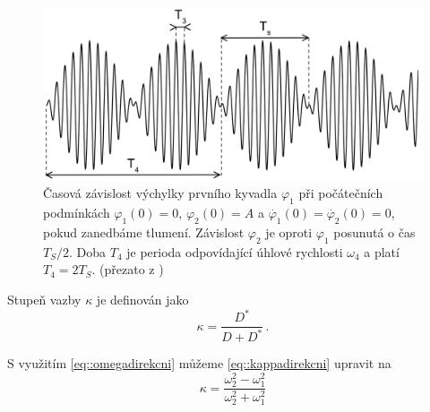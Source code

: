 \begin{figure}[htbp]
\centering
\includegraphics[width=\textwidth-2cm]{graficos/ts}
\caption{Časová závislost výchylky prvního kyvadla $\varphi_1$ při počátečních podmínkách $\varphi_1(0)=0$, $\varphi_2(0)=A$ a $\dot{\varphi_1}(0)=\dot{\varphi_2}(0)=0$, pokud zanedbáme tlumení. Závislost $\varphi_2$ je oproti $\varphi_1$ posunutá o čas $T_S/2$. Doba $T_4$ je perioda odpovídající úhlové rychlosti $\omega_4$ a platí $T_4=2T_S$. (přezato z \cite{ZFP})}
\label{obr::tretipripad}
\end{figure}

Stupeň vazby $\kappa$ je definován jako \cite{ZFP}
\begin{equation} \label{eq::kappadirekcni}
\kappa = \frac{D^{\ast}}{D+D^{\ast}} \,.
\end{equation} 

S využitím \eqref{eq::omegadirekcni} můžeme \eqref{eq::kappadirekcni} upravit na
\begin{equation}
\kappa = \frac{\omega_2^2-\omega_1^2}{\omega_2^2+\omega_1^2}
\end{equation}